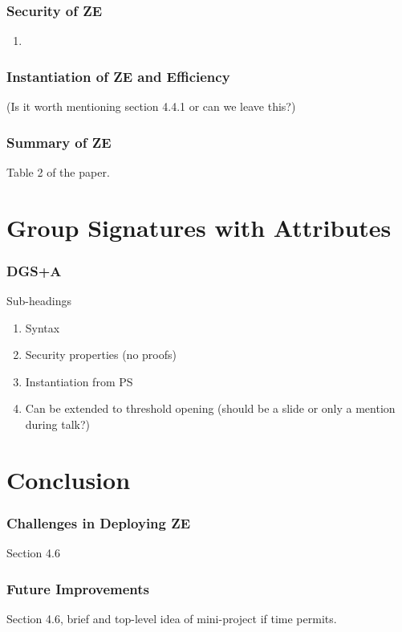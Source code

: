 \documentclass{beamer}
\begin{document}
    \begin{frame}
        \frametitle{Security of ZE}
        \begin{enumerate}
            \item \textbf{}
        \end{enumerate}
    \end{frame}

    \begin{frame}
        \frametitle{Instantiation of ZE and Efficiency}    
        (Is it worth mentioning section 4.4.1 or can we leave this?)
    \end{frame}

    \begin{frame}
        \frametitle{Summary of ZE}
        Table 2 of the paper.
    \end{frame}

    \section{Group Signatures with Attributes}
    \begin{frame}
        \frametitle{DGS+A}
        Sub-headings
        \begin{enumerate}
            \item Syntax
            \item Security properties (no proofs)
            \item Instantiation from PS
            \item Can be extended to threshold opening (should be a slide or
            only a mention during talk?)
        \end{enumerate}
    \end{frame}

    \section{Conclusion}
    \begin{frame}
        \frametitle{Challenges in Deploying ZE}
        Section 4.6
    \end{frame}

    \begin{frame}
        \frametitle{Future Improvements}
        Section 4.6, brief and top-level idea of mini-project if time permits.
    \end{frame}
\end{document}

